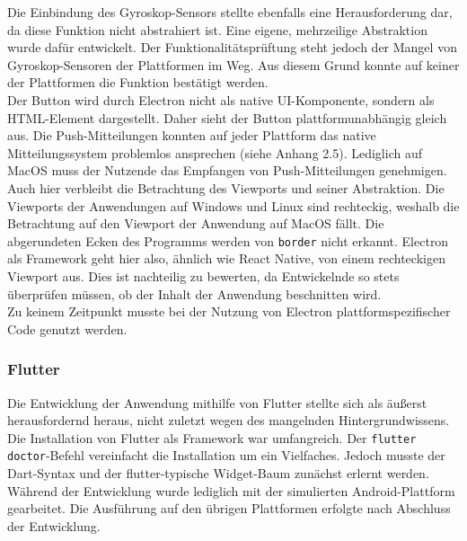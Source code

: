 \documentclass[a4paper]{scrartcl}
\begin{document}
Die Einbindung des Gyroskop-Sensors stellte ebenfalls eine Herausforderung dar, da diese Funktion nicht abstrahiert ist. Eine eigene, mehrzeilige Abstraktion wurde dafür entwickelt. Der Funktionalitätsprüftung steht jedoch der Mangel von Gyroskop-Sensoren der Plattformen im Weg. Aus diesem Grund konnte auf keiner der Plattformen die Funktion bestätigt werden. \\

Der Button wird durch Electron nicht als native UI-Komponente, sondern als HTML-Element dargestellt. Daher sieht der Button plattformunabhängig gleich aus. Die Push-Mitteilungen konnten auf jeder Plattform das native Mitteilungssystem problemlos ansprechen (siehe Anhang 2.5). Lediglich auf MacOS muss der Nutzende das Empfangen von Push-Mitteilungen genehmigen. \\

Auch hier verbleibt die Betrachtung des Viewports und seiner Abstraktion. Die Viewports der Anwendungen auf Windows und Linux sind rechteckig, weshalb die Betrachtung auf den Viewport der Anwendung auf MacOS fällt. Die abgerundeten Ecken des Programms werden von \texttt{border} nicht erkannt. Electron als Framework geht hier also, ähnlich wie React Native, von einem rechteckigen Viewport aus. Dies ist nachteilig zu bewerten, da Entwickelnde so stets überprüfen müssen, ob der Inhalt der Anwendung beschnitten wird. \\

Zu keinem Zeitpunkt musste bei der Nutzung von Electron plattformspezifischer Code genutzt werden.

\subsubsection{Flutter}

Die Entwicklung der Anwendung mithilfe von Flutter stellte sich als äußerst herausfordernd heraus, nicht zuletzt wegen des mangelnden Hintergrundwissens. Die Installation von Flutter als Framework war umfangreich. Der \texttt{flutter doctor}-Befehl vereinfacht die Installation um ein Vielfaches. Jedoch musste der Dart-Syntax und der flutter-typische Widget-Baum zunächst erlernt werden. Während der Entwicklung wurde lediglich mit der simulierten Android-Plattform gearbeitet. Die Ausführung auf den übrigen Plattformen erfolgte nach Abschluss der Entwicklung. \\
\end{document}
